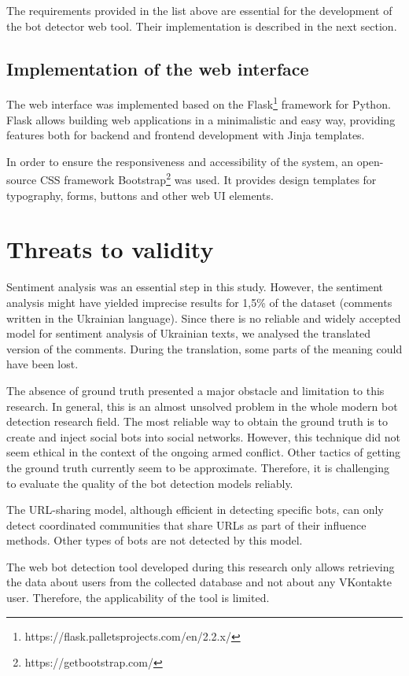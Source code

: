The requirements provided in the list above are essential for the development
of the bot detector web tool. Their implementation is described in the next section.

\subsection{Implementation of the web interface}

The web interface was implemented based on the Flask\footnote{https://flask.palletsprojects.com/en/2.2.x/} framework for Python. Flask allows building web applications in a minimalistic and easy way, providing features both for backend and frontend development with Jinja templates.

In order to ensure the responsiveness and accessibility of the system, an open-source CSS framework Bootstrap\footnote{https://getbootstrap.com/} was used. It provides design templates for typography, forms, buttons and other web UI elements.

\section{Threats to validity}
Sentiment analysis was an essential step in this study. However, the sentiment analysis might have yielded imprecise results for 1,5\% of the dataset (comments written in the Ukrainian language). Since there is no reliable and widely accepted model for sentiment analysis of Ukrainian texts, we analysed the translated version of the comments. During the translation, some parts of the meaning could have been lost.

The absence of ground truth presented a major obstacle and limitation to this research. In general, this is an almost unsolved problem in the whole modern bot detection research field. The most reliable way to obtain the ground truth is to create and inject social bots into social networks. However, this technique did not seem ethical in the context of the ongoing armed conflict. Other tactics of getting the ground truth currently seem to be approximate. Therefore, it is challenging to evaluate the quality of the bot detection models reliably. 

The URL-sharing model, although efficient in detecting specific bots, can only detect coordinated communities that share URLs as part of their influence methods. Other types of bots are not detected by this model.

The web bot detection tool developed during this research only allows retrieving the data about users from the collected database and not about any VKontakte user. Therefore, the applicability of the tool is limited.